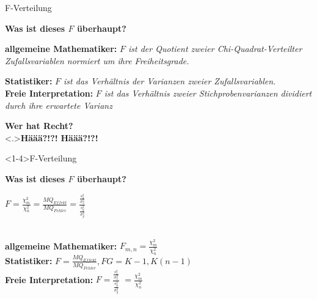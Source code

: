 \documentclass{beamer}
\begin{document}
	\begin{frame}{F-Verteilung}
		\begin{center}
			\textbf{Was ist dieses $F$ überhaupt?}
		\end{center}
		\textbf{allgemeine Mathematiker:} \emph{$F$ ist der Quotient zweier Chi-Quadrat-Verteilter Zufallsvariablen normiert um ihre Freiheitsgrade.} \\ \vspace{0.7ex}
		\pause
		
		\textbf{Statistiker:} \emph{$F$ ist das Verhältnis der Varianzen zweier Zufallsvariablen.}\\
		\vspace{0.7ex} \pause
		\textbf{Freie Interpretation:} \emph{$F$ ist das Verhältnis zweier Stichprobenvarianzen dividiert durch ihre erwartete Varianz} \\ \vspace{0.7ex} \pause
		\begin{center}
			\textbf{Wer hat Recht? }
			\\ \vspace{0.7ex} \pause \note<.>{\alert{{\Large \textbf{Häää?!?!}} }}
			\alert{{\Large \textbf{Häää?!?!}} }
		\end{center}
	\end{frame}
	
	\begin{frame}<1-4>{F-Verteilung}
		\begin{center}
			\textbf{Was ist dieses $F$ überhaupt?}
		
		\pause[]$F=\frac{\chi^2_m}{\chi^2_n}$\pause[3] $=\frac{MQ_{Effekt}}{MQ_{Fehler}}$\pause[4] $=\frac{\frac{s_x^2}{\sigma_x^2}}{\frac{s_y^2}{\sigma_y^2}}$
		\end{center}
		\pause[2]~\\ \vspace{1.2ex}
		\textbf{allgemeine Mathematiker:} \emph{$F_{m,n}=\frac{\chi^2_m}{\chi^2_n}$}   
		 \pause[3] ~\\ \vspace{1.2ex}
		\textbf{Statistiker:} $F = \frac{MQ_{Effekt}}{MQ_{Fehler}}, FG=K-1,K(n-1)$ \pause[4] ~\\  \vspace{1.2ex} 
		\textbf{Freie Interpretation:} $F = \frac{\frac{s_x^2}{\sigma_x^2}}{\frac{s_y^2}{\sigma_y^2}}$ \pause[5]  $=\frac{\chi^2_m}{\chi^2_n}$ ~\\
	\end{frame}
	
\end{document}
